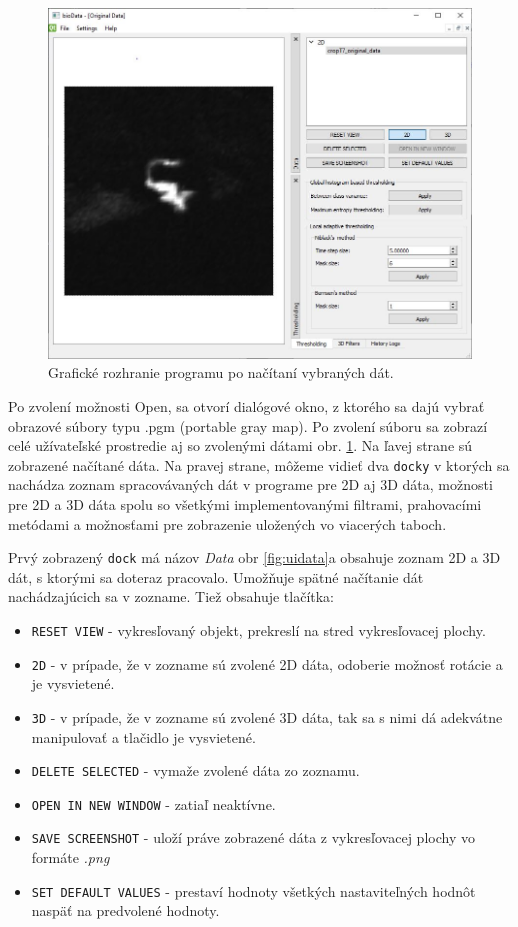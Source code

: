 \documentclass[a4paper,12pt,twoside]{article}%
\begin{document}
\begin{figure}[h!]
 \begin{center} 
 \includegraphics[scale=0.50]{pics/ui1.jpg}
\caption{Grafické rozhranie programu po načítaní vybraných dát.}
\label{fig:ui1}
\end{center} 
\end{figure}

Po zvolení možnosti Open, sa otvorí dialógové okno, z ktorého sa dajú vybrať obrazové súbory typu .pgm (portable gray map). Po zvolení súboru sa zobrazí celé užívateľské prostredie aj so zvolenými dátami obr. \ref{fig:ui1}. Na ľavej strane sú zobrazené načítané dáta. Na pravej strane, môžeme vidieť dva \texttt{docky} v ktorých sa nachádza zoznam spracovávaných dát v programe pre 2D aj 3D dáta, možnosti pre 2D a 3D dáta spolu so všetkými implementovanými filtrami, prahovacími metódami a možnosťami pre zobrazenie uložených vo viacerých taboch. 

Prvý zobrazený \texttt{dock} má názov \textit{Data} obr \ref{fig:uidata}a obsahuje zoznam 2D a 3D dát, s ktorými sa doteraz pracovalo. Umožňuje spätné načítanie dát nachádzajúcich sa v zozname. Tiež obsahuje tlačítka: 
\begin{itemize}
\item \texttt{RESET VIEW} - vykresľovaný objekt, prekreslí na stred vykresľovacej plochy.  
\item \texttt{2D} - v prípade, že v zozname sú zvolené 2D dáta, odoberie možnosť rotácie a je vysvietené.
\item \texttt{3D} - v prípade, že v zozname sú zvolené 3D dáta, tak sa s nimi dá adekvátne manipulovať a tlačidlo je vysvietené.
\item \texttt{DELETE SELECTED} - vymaže zvolené dáta zo zoznamu.
\item \texttt{OPEN IN NEW WINDOW} - zatiaľ neaktívne.
\item \texttt{SAVE SCREENSHOT} - uloží práve zobrazené dáta z vykresľovacej plochy vo formáte \textit{.png}
\item \texttt{SET DEFAULT VALUES} - prestaví hodnoty všetkých nastaviteľných hodnôt naspäť na predvolené hodnoty.
\end{itemize}
\end{document}
